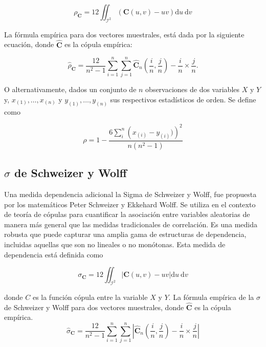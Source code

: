 \begin{equation}\label{SpearTeo}
    \rho_{\mathbf{C}}=12 \iint_{\mathcal{I}^2} (\mathbf{C}(u, v)-u v) \mathrm{d} u \mathrm{~d} v
\end{equation}

La fórmula empírica para dos vectores muestrales, está dada por la siguiente ecuación, donde $\hat{\mathbf{C}}$ es la cópula empírica: 

\begin{equation}\label{Spearemp}
    \hat{\rho}_{\mathbf{C}}=\frac{12}{n^2-1} \sum_{i=1}^n \sum_{j=1}^n\hat{\mathbf{C}}_n\left(\frac{i}{n}, \frac{j}{n}\right)-\frac{i}{n} \times \frac{j}{n}.
\end{equation}

O alternativamente, dados un conjunto de $n$ observaciones de dos variables $X$ y $Y$ y, $x_{(1)}, \dots, x_{(n)}$ y $y_{(1)}, \dots, y_{(n)}$ sus respectivos estadísticos de orden. Se define como

\begin{equation}
    \rho = 1 - \frac{6 \sum_{i}^{n} \left (  x_{(i)} - y_{(i)}) \right )^{2}}{n(n^{2} - 1)}
\end{equation}

\subsection{$\sigma$ de Schweizer y Wolff}

Una medida dependencia adicional la Sigma de Schweizer y Wolff, fue propuesta por los matemáticos Peter Schweizer y Ekkehard Wolff. Se utiliza en el contexto de teoría de cópulas para cuantificar la asociación entre variables aleatorias de manera más general que las medidas tradicionales de correlación. Es una medida robusta que puede capturar una amplia gama de estructuras de dependencia, incluidas aquellas que son no lineales o no monótonas. Esta medida de dependencia está definida como

\begin{equation}\label{SWETeo}
    \sigma_{\mathbf{C}}=12 \iint_{\mathcal{I}^2}|\mathbf{C}(u, v)-u v| \mathrm{d} u \mathrm{~d} v
\end{equation}

donde $C$ es la función cópula entre la variable $X$ y $Y$.
La fórmula empírica de la $\sigma$ de Schweizer y Wolff para dos vectores muestrales, donde $\hat{\mathbf{C}}$ es la cópula empírica. 
\begin{equation}\label{SWEemp}
    \hat{\sigma}_{\mathbf{C}}=\frac{12}{n^2-1} \sum_{i=1}^n \sum_{j=1}^n\left|\hat{\mathbf{C}}_n\left(\frac{i}{n}, \frac{j}{n}\right)-\frac{i}{n} \times \frac{j}{n}\right|
\end{equation}


